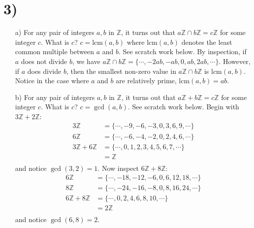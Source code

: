 \documentclass{article}
\begin{document}
\section*{3)}
\begin{itemize}
    \item[a)] For any pair of integers $a,b$ in $\mathbb{Z}$, it turns out that $a\mathbb{Z} \cap b\mathbb{Z} = c\mathbb{Z}$ for some integer $c$. What is $c$? 
    \newline\newline
    $c = \text{lcm}(a,b)$ where lcm$(a,b)$ denotes the least common multiple between $a$ and $b$. See scratch work below.
    \newline\newline
    By inspection, if $a$ does not divide $b$, we have $a\mathbb{Z} \cap b\mathbb{Z} = \{\cdots, -2ab, -ab, 0, ab, 2ab, \cdots \}$. However, if $a$ does divide $b$, then the smallest non-zero value in $a\mathbb{Z} \cap b\mathbb{Z}$ is $\text{lcm}(a,b)$. Notice in the case where $a$ and $b$ are relatively prime, $\text{lcm}(a,b) = ab$.
    
    \item[b)] For any pair of integers $a,b$ in $\mathbb{Z}$, it turns out that $a\mathbb{Z} + b\mathbb{Z} = c\mathbb{Z}$ for some integer $c$. What is $c$?
    \newline\newline
    $c = \gcd{(a,b)}$. See scratch work below.
    \newline\newline
    Begin with $3\mathbb{Z} + 2\mathbb{Z}$:
    \begin{align*}
        3\mathbb{Z} &= \{\cdots, -9, -6, -3, 0, 3, 6, 9, \cdots\} \\
        6\mathbb{Z} &= \{\cdots, -6, -4, -2, 0, 2, 4, 6, \cdots\} \\
        3\mathbb{Z} + 6\mathbb{Z} &= \{\cdots, 0, 1, 2, 3, 4, 5, 6, 7, \cdots\} \\
        &= \mathbb{Z} \\
    \end{align*}
    and notice $\gcd{(3,2)} = 1$.
    \newline
    Now inspect $6\mathbb{Z} + 8\mathbb{Z}$:
    \begin{align*}
        6\mathbb{Z} &= \{\cdots, -18, -12, -6, 0, 6, 12, 18, \cdots\} \\
        8\mathbb{Z} &= \{\cdots, -24, -16, -8, 0, 8, 16, 24, \cdots\} \\
        6\mathbb{Z} + 8\mathbb{Z} &= \{\cdots, 0, 2, 4, 6, 8, 10, \cdots\} \\
        &= 2\mathbb{Z} \\
    \end{align*}
    and notice $\gcd{(6,8)} = 2$. 
    
\end{itemize}
\end{document}
